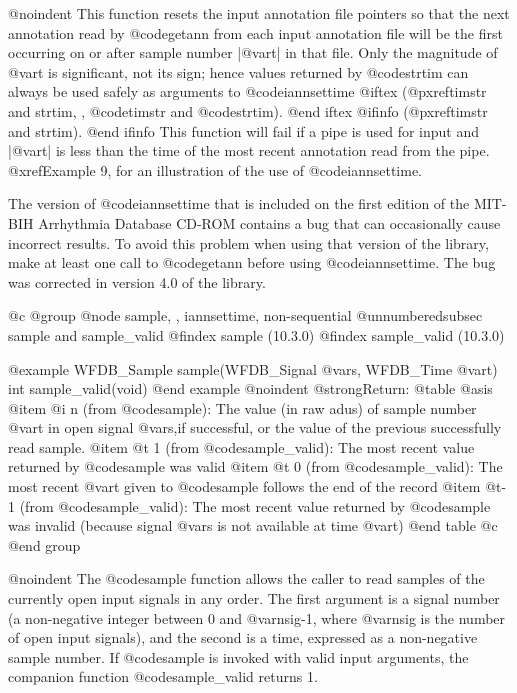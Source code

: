 {{{{{{{{{@noindent
This function resets the input annotation file pointers so that the next
annotation read by @code{getann} from each input annotation file will be
the first occurring on or after sample number |@var{t}| in that file.
Only the magnitude of @var{t} is significant, not its sign; hence values
returned by @code{strtim} can always be used safely as arguments to
@code{iannsettime}
@iftex
(@pxref{timstr and strtim, , @code{timstr} and @code{strtim}}).
@end iftex
@ifinfo
(@pxref{timstr and strtim}).
@end ifinfo
This function will fail if a pipe is used for input and |@var{t}| is less
than the time of the most recent annotation read from the pipe.
@xref{Example 9}, for an illustration of the use of @code{iannsettime}.

The version of @code{iannsettime} that is included on the first edition
of the MIT-BIH Arrhythmia Database CD-ROM contains a bug that can
occasionally cause incorrect results.  To avoid this problem when using
that version of the library, make at least one call to @code{getann}
before using @code{iannsettime}.  The bug was corrected in version 4.0
of the library.

@c @group
@node     sample, , iannsettime, non-sequential
@unnumberedsubsec sample and sample_valid
@findex sample (10.3.0)
@findex sample_valid (10.3.0)

@example
WFDB_Sample sample(WFDB_Signal @var{s}, WFDB_Time @var{t})
int sample_valid(void)
@end example
@noindent
@strong{Return:}
@table @asis
@item @i{ n}
(from @code{sample}): The value (in raw adus) of sample number @var{t}
in open signal @var{s},if successful, or the value of the previous
successfully read sample.
@item @t{ 1}
(from @code{sample_valid}): The most recent value returned by
@code{sample} was valid
@item @t{ 0}
(from @code{sample_valid}): The most recent @var{t} given to @code{sample}
follows the end of the record
@item @t{-1}
(from @code{sample_valid}): The most recent value returned by
@code{sample} was invalid (because signal @var{s} is not available at time
@var{t})
@end table
@c @end group

@noindent
The @code{sample} function allows the caller to read samples of the
currently open input signals in any order.  The first argument is a
signal number (a non-negative integer between 0 and @var{nsig}-1,
where @var{nsig} is the number of open input signals), and the second
is a time, expressed as a non-negative sample number. If @code{sample}
is invoked with valid input arguments, the companion function
@code{sample_valid} returns 1.

}}}}}}}}}
